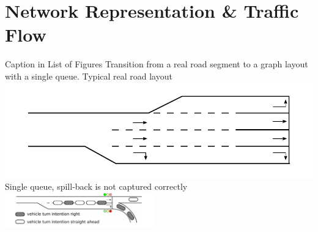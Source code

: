 %


\section{Network Representation \& Traffic Flow}
\label{sec:signals_network_traffic_flow}

\createfigure%
{Caption in List of Figures}%
{Transition from a real road segment to a graph layout with a single queue.}
{\label{fig:combined_model}}
{%
  \createsubfigure%
	{Typical real road layout}
	{\includegraphics[width=0.475\linewidth]{extending/figures/signalslanes/real_road_layout.pdf}}
	{\label{fig:real_road_layout}}
  \createsubfigure%
	{Single queue, spill-back is not captured correctly}%
	{\includegraphics[width=0.48\textwidth]{extending/figures/signalslanes/single_queue_model_inkscape.pdf}}%
	{\label{fig:lanes_representation_single_queue}}%
}%
{\citet{Grether2014PhD}}

